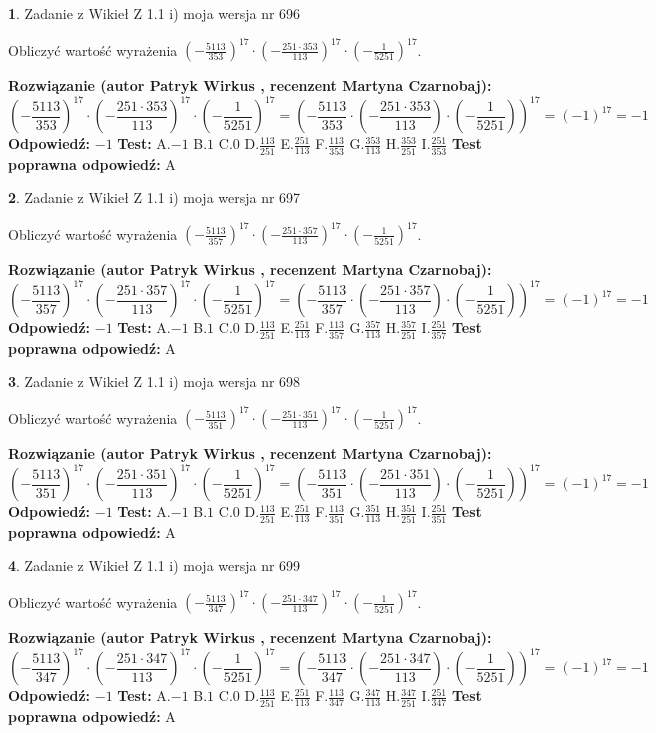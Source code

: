 \documentclass[12pt, a4paper]{article}
\theoremstyle{definition} %
\newtheorem{zad}{}
\newcommand{\zadStart}[1]{\begin{zad}#1\newline}
\newcommand{\zadStop}{\end{zad}}
\newcommand{\rozwStart}[2]{\noindent \textbf{Rozwiązanie (autor #1 , recenzent #2): }\newline}
\newcommand{\rozwStop}{\newline}
\newcommand{\odpStart}{\noindent \textbf{Odpowiedź:}\newline}
\newcommand{\odpStop}{\newline}
\newcommand{\testStart}{\noindent \textbf{Test:}\newline}
\newcommand{\testStop}{\newline}
\newcommand{\kluczStart}{\noindent \textbf{Test poprawna odpowiedź:}\newline}
\newcommand{\kluczStop}{\newline}
\begin{document}
\zadStart{Zadanie z Wikieł Z 1.1 i) moja wersja nr 696}

Obliczyć wartość wyrażenia $(-\frac{5113}{353})^{17} \cdot (-\frac{251 \cdot 353}{113})^{17} \cdot (-\frac{1}{5251})^{17}$.
\zadStop
\rozwStart{Patryk Wirkus}{Martyna Czarnobaj}
$$(-\frac{5113}{353})^{17} \cdot (-\frac{251 \cdot 353}{113})^{17} \cdot (-\frac{1}{5251})^{17} = (-\frac{5113}{353} \cdot (-\frac{251 \cdot 353}{113}) \cdot (-\frac{1}{5251}))^{17} = (-1)^{17} = -1$$
\rozwStop
\odpStart
$-1$
\odpStop
\testStart
A.$-1$ B.$1$ C.$0$ D.$\frac{113}{251}$ E.$\frac{251}{113}$
F.$\frac{113}{353}$ G.$\frac{353}{113}$
H.$\frac{353}{251}$
I.$\frac{251}{353}$
\testStop
\kluczStart
A
\kluczStop



\zadStart{Zadanie z Wikieł Z 1.1 i) moja wersja nr 697}

Obliczyć wartość wyrażenia $(-\frac{5113}{357})^{17} \cdot (-\frac{251 \cdot 357}{113})^{17} \cdot (-\frac{1}{5251})^{17}$.
\zadStop
\rozwStart{Patryk Wirkus}{Martyna Czarnobaj}
$$(-\frac{5113}{357})^{17} \cdot (-\frac{251 \cdot 357}{113})^{17} \cdot (-\frac{1}{5251})^{17} = (-\frac{5113}{357} \cdot (-\frac{251 \cdot 357}{113}) \cdot (-\frac{1}{5251}))^{17} = (-1)^{17} = -1$$
\rozwStop
\odpStart
$-1$
\odpStop
\testStart
A.$-1$ B.$1$ C.$0$ D.$\frac{113}{251}$ E.$\frac{251}{113}$
F.$\frac{113}{357}$ G.$\frac{357}{113}$
H.$\frac{357}{251}$
I.$\frac{251}{357}$
\testStop
\kluczStart
A
\kluczStop



\zadStart{Zadanie z Wikieł Z 1.1 i) moja wersja nr 698}

Obliczyć wartość wyrażenia $(-\frac{5113}{351})^{17} \cdot (-\frac{251 \cdot 351}{113})^{17} \cdot (-\frac{1}{5251})^{17}$.
\zadStop
\rozwStart{Patryk Wirkus}{Martyna Czarnobaj}
$$(-\frac{5113}{351})^{17} \cdot (-\frac{251 \cdot 351}{113})^{17} \cdot (-\frac{1}{5251})^{17} = (-\frac{5113}{351} \cdot (-\frac{251 \cdot 351}{113}) \cdot (-\frac{1}{5251}))^{17} = (-1)^{17} = -1$$
\rozwStop
\odpStart
$-1$
\odpStop
\testStart
A.$-1$ B.$1$ C.$0$ D.$\frac{113}{251}$ E.$\frac{251}{113}$
F.$\frac{113}{351}$ G.$\frac{351}{113}$
H.$\frac{351}{251}$
I.$\frac{251}{351}$
\testStop
\kluczStart
A
\kluczStop



\zadStart{Zadanie z Wikieł Z 1.1 i) moja wersja nr 699}

Obliczyć wartość wyrażenia $(-\frac{5113}{347})^{17} \cdot (-\frac{251 \cdot 347}{113})^{17} \cdot (-\frac{1}{5251})^{17}$.
\zadStop
\rozwStart{Patryk Wirkus}{Martyna Czarnobaj}
$$(-\frac{5113}{347})^{17} \cdot (-\frac{251 \cdot 347}{113})^{17} \cdot (-\frac{1}{5251})^{17} = (-\frac{5113}{347} \cdot (-\frac{251 \cdot 347}{113}) \cdot (-\frac{1}{5251}))^{17} = (-1)^{17} = -1$$
\rozwStop
\odpStart
$-1$
\odpStop
\testStart
A.$-1$ B.$1$ C.$0$ D.$\frac{113}{251}$ E.$\frac{251}{113}$
F.$\frac{113}{347}$ G.$\frac{347}{113}$
H.$\frac{347}{251}$
I.$\frac{251}{347}$
\testStop
\kluczStart
A
\kluczStop
\end{document}
